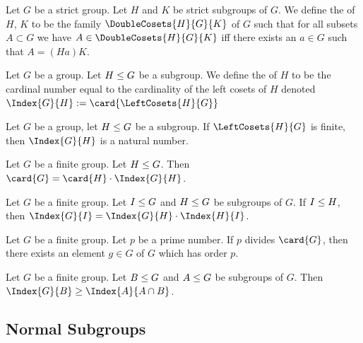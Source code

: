\begin{definition}
Let $G$ be a strict group.
Let $H$ and $K$ be strict subgroups of $G$.
We define the  of $H$, $K$ to be the family
$\DoubleCosets{H}{G}{K}$ of $G$ such that for all subsets $A\subset G$
we have $A\in\DoubleCosets{H}{G}{K}$ iff there exists an $a\in G$ such
that $A=(Ha)K$.
\end{definition}

\begin{definition}\label{defn:group:index-of-a-subgroup}
Let $G$ be a group. Let $H\leq G$ be a subgroup.
We define the  of $H$ to be the cardinal number
equal to the cardinality of the left cosets of $H$ denoted $\Index{G}{H}:=\card{\LeftCosets{H}{G}}$
\end{definition}

\begin{theorem}
Let $G$ be a group, let $H\leq G$ be a subgroup.
If $\LeftCosets{H}{G}$ is finite, then $\Index{G}{H}$ is a natural number.
\end{theorem}

\begin{theorem}
Let $G$ be a finite group. Let $H\leq G$.
Then $\card{G}=\card{H}\cdot\Index{G}{H}$.
\end{theorem}

\begin{theorem}
Let $G$ be a finite group.
Let $I\leq G$ and $H\leq G$ be subgroups of $G$.
If $I\leq H$, then $\Index{G}{I}=\Index{G}{H}\cdot\Index{H}{I}$.
\end{theorem}

\begin{theorem}
Let $G$ be a finite group. Let $p$ be a prime number.
If $p$ divides $\card{G}$, then there exists an element $g\in G$ of
$G$ which has order $p$.
\end{theorem}

\begin{theorem}
Let $G$ be a finite group.
Let $B\leq G$ and $A\leq G$ be subgroups of $G$.
Then $\Index{G}{B}\geq\Index{A}{A\cap B}$.
\end{theorem}

\subsection{Normal Subgroups}

